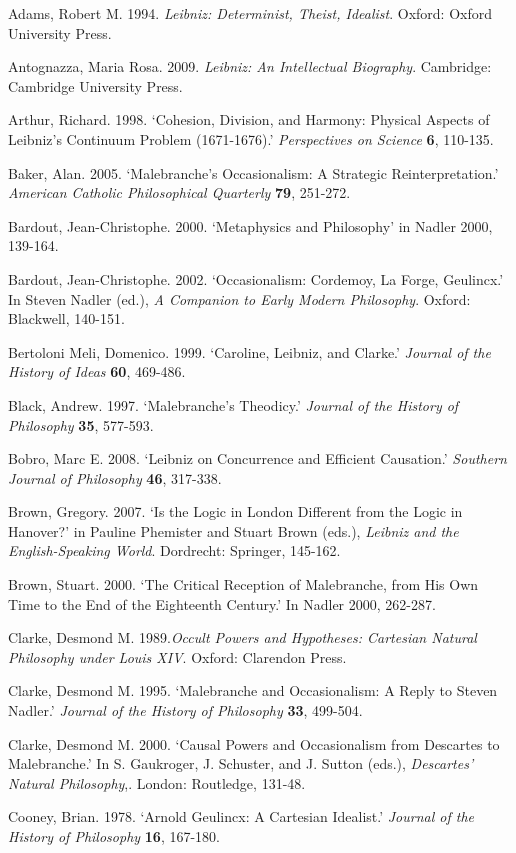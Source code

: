 \documentclass{article}
\begin{document}
Adams, Robert M. 1994. \emph{Leibniz: Determinist, Theist, Idealist}.
Oxford: Oxford University Press.

Antognazza, Maria Rosa. 2009. \emph{Leibniz: An Intellectual Biography}.
Cambridge: Cambridge University Press.

Arthur, Richard. 1998. `Cohesion, Division, and Harmony: Physical
Aspects of Leibniz's Continuum Problem (1671-1676).' \emph{Perspectives
on Science} \textbf{6}, 110-135.

Baker, Alan. 2005. `Malebranche's Occasionalism: A Strategic
Reinterpretation.' \emph{American Catholic Philosophical Quarterly}
\textbf{79}, 251-272.

Bardout, Jean-Christophe. 2000. `Metaphysics and Philosophy' in Nadler
2000, 139-164.

Bardout, Jean-Christophe. 2002. `Occasionalism: Cordemoy, La Forge,
Geulincx.' In Steven Nadler (ed.), \emph{A Companion to Early Modern
Philosophy}. Oxford: Blackwell, 140-151.

Bertoloni Meli, Domenico. 1999. `Caroline, Leibniz, and Clarke.'
\emph{Journal of the History of Ideas} \textbf{60}, 469-486.

Black, Andrew. 1997. `Malebranche's Theodicy.' \emph{Journal of the
History of Philosophy} \textbf{35}, 577-593.

Bobro, Marc E. 2008. `Leibniz on Concurrence and Efficient Causation.'
\emph{Southern Journal of Philosophy} \textbf{46}, 317-338.

Brown, Gregory. 2007. `Is the Logic in London Different from the Logic
in Hanover?' in Pauline Phemister and Stuart Brown (eds.), \emph{Leibniz
and the English-Speaking World}. Dordrecht: Springer, 145-162.

Brown, Stuart. 2000. `The Critical Reception of Malebranche, from His
Own Time to the End of the Eighteenth Century.' In Nadler 2000, 262-287.

Clarke, Desmond M. 1989.\emph{Occult Powers and Hypotheses: Cartesian
Natural Philosophy under Louis XIV}. Oxford: Clarendon Press.

Clarke, Desmond M. 1995. `Malebranche and Occasionalism: A Reply to
Steven Nadler.' \emph{Journal of the History of Philosophy} \textbf{33},
499-504.

Clarke, Desmond M. 2000. `Causal Powers and Occasionalism from Descartes
to Malebranche.' In S. Gaukroger, J. Schuster, and J. Sutton (eds.),
\emph{Descartes' Natural Philosophy},. London: Routledge, 131-48.

Cooney, Brian. 1978. `Arnold Geulincx: A Cartesian Idealist.'
\emph{Journal of the History of Philosophy} \textbf{16}, 167-180.
\end{document}
